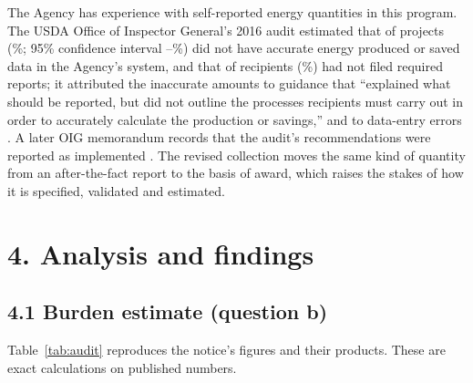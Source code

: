 \documentclass[11pt]{article}
\begin{document}
The Agency has experience with self-reported energy quantities in this program. The
USDA Office of Inspector General's 2016 audit estimated that \OigInaccurate{} of
\OigWithReports{} projects (\OigPct\%; 95\% confidence interval
\OigCiLow--\OigCiHigh\%) did not have accurate energy produced or saved data in the
Agency's system, and that \OigNoReports{} of \OigRequired{} recipients (\OigNoReportsPct\%)
had not filed required reports; it attributed the inaccurate amounts to guidance that
``explained what should be reported, but did not outline the processes recipients must
carry out in order to accurately calculate the production or savings,'' and to data-entry
errors \cite{oig2016reap}. A later OIG memorandum records that the audit's
recommendations were reported as implemented \cite{oig2023memo}. The revised collection
moves the same kind of quantity from an after-the-fact report to the basis of award, which
raises the stakes of how it is specified, validated and estimated.

\section*{4. Analysis and findings}

\subsection*{4.1 Burden estimate (question b)}

Table~\ref{tab:audit} reproduces the notice's figures and their products. These are
exact calculations on published numbers.

\begin{table}[!htbp]
\caption{Arithmetic of the burden estimate in the PRA notice (91 FR 62611) and the
current OMB inventory (ICR \InvIcr).}\label{tab:audit}
\centering\footnotesize

\end{table}
\end{document}

